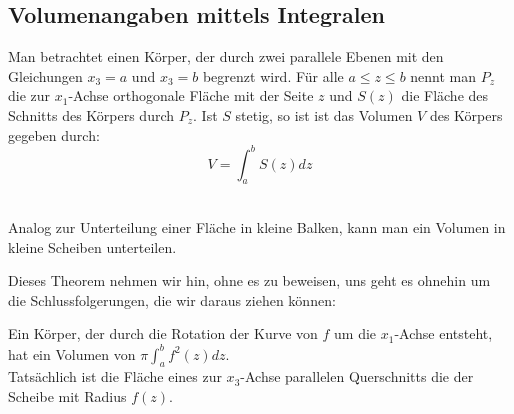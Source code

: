 \documentclass[main.tex]{subfiles}
\begin{document}
\subsection{Volumenangaben mittels Integralen}
\begin{Theorem}
  Man betrachtet einen Körper, der durch zwei parallele Ebenen mit den Gleichungen $x_3 = a$ und $x_3 = b$ begrenzt wird.
  Für alle $a\leq z \leq b$ nennt man $P_z$ die zur $x_1$-Achse orthogonale Fläche mit der Seite $z$ und $S(z)$ die Fläche des
  Schnitts des Körpers durch $P_z$. Ist $S$ stetig, so ist ist das Volumen $V$ des Körpers gegeben durch:
  $$V=\int_a^b S(z)dz$$\\
\end{Theorem}
\begin{Bemerkung}
  Analog zur Unterteilung einer Fläche in kleine Balken, kann man ein Volumen in kleine Scheiben unterteilen.
\end{Bemerkung}
\begin{Bemerkung}
  Dieses Theorem nehmen wir hin, ohne es zu beweisen, uns geht es ohnehin um die Schlussfolgerungen, die wir daraus ziehen können:
\end{Bemerkung}
\begin{Theorem}
  Ein Körper, der durch die Rotation der Kurve von $f$ um die $x_1$-Achse entsteht, hat ein Volumen von
  \( \displaystyle \pi \int_a^b f^2(z)dz\).\\
  Tatsächlich ist die Fläche eines zur $x_3$-Achse parallelen Querschnitts die der Scheibe mit Radius $f(z)$.
\end{Theorem}
\begin{minipage}{0.8\textwidth}
\end{minipage}
\begin{minipage}{0.2\textwidth}
  \uptodownarrow
\end{minipage}
\end{document}
